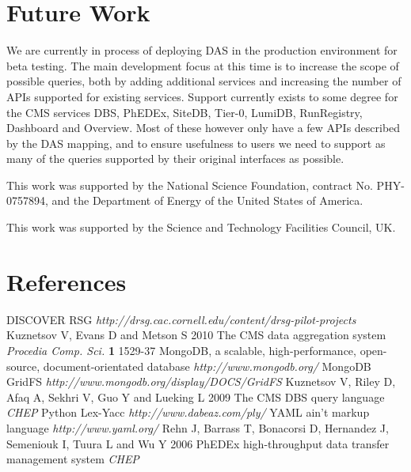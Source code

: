 \documentclass[a4paper]{jpconf}
\begin{document}
\section{Future Work}

We are currently in process of deploying DAS in the production environment for beta testing. The main development focus at this time is to increase the scope of possible queries, both by adding additional services and increasing the number of APIs supported for existing services. Support currently exists to some degree for the CMS services DBS, PhEDEx, SiteDB, Tier-0, LumiDB, RunRegistry, Dashboard and Overview. Most of these however only have a few APIs described by the DAS mapping, and to ensure usefulness to users we need to support as many of the queries supported by their original interfaces as possible.

\ack

This work was supported by the National Science Foundation, contract No. PHY-0757894, and the Department of Energy of the United States of America.

This work was supported by the Science and Technology Facilities Council, UK.

\appendix

\section*{References}
\begin{thebibliography}{9}
 DISCOVER RSG {\it http://drsg.cac.cornell.edu/content/drsg-pilot-projects}
 Kuznetsov V, Evans D and Metson S 2010 The CMS data aggregation system {\it Procedia Comp. Sci.} {\bf 1} 1529-37
 MongoDB, a scalable, high-performance, open-source, document-orientated database {\it http://www.mongodb.org/}
 MongoDB GridFS {\it http://www.mongodb.org/display/DOCS/GridFS}
 Kuznetsov V, Riley D, Afaq A, Sekhri V, Guo Y and Lueking L 2009 The CMS DBS query language {\it CHEP}
 Python Lex-Yacc {\it http://www.dabeaz.com/ply/}
 YAML ain't markup language {\it http://www.yaml.org/}
 Rehn J, Barrass T, Bonacorsi D, Hernandez J, Semeniouk I, Tuura L and Wu Y 2006 PhEDEx high-throughput data transfer management system {\it CHEP}
\end{thebibliography}
\end{document}
